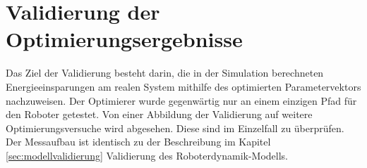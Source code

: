 \chapter{Validierung der Optimierungsergebnisse}
\label{cha:Validierung}
Das Ziel der Validierung besteht darin, die in der Simulation berechneten Energieeinsparungen am realen System mithilfe des optimierten Parametervektors nachzuweisen. Der Optimierer wurde gegenwärtig nur an einem einzigen Pfad für den Roboter getestet. Von einer Abbildung der Validierung auf weitere Optimierungsversuche wird abgesehen. Diese sind im Einzelfall zu überprüfen. Der Messaufbau ist identisch zu der Beschreibung im Kapitel \ref{sec:modellvalidierung} Validierung des Roboterdynamik-Modells. 
%
